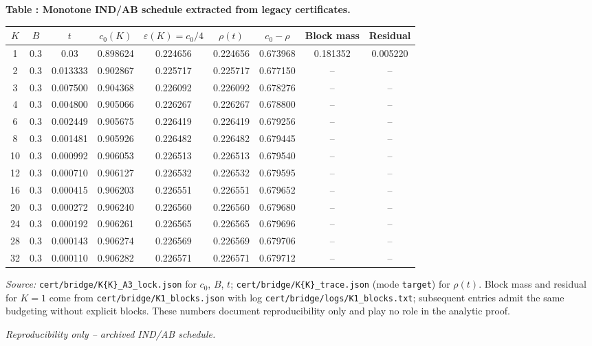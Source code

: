 \label{tab:ind-schedule}
\begin{center}
  \small\textbf{Table \thetable: Monotone IND/AB schedule extracted from legacy certificates.}
\end{center}
\begin{center}
  \small
  \begin{tabular}{ccccccccc}
    \toprule
    $K$ & $B$ & $t$ & $c_0(K)$ & $\varepsilon(K)=c_0/4$ & $\rho(t)$ & $c_0-\rho$ & Block mass & Residual \\
    \midrule
    1 & 0.3 & 0.03 & 0.898624 & 0.224656 & 0.224656 & 0.673968 & 0.181352 & 0.005220 \\
    2 & 0.3 & 0.013333 & 0.902867 & 0.225717 & 0.225717 & 0.677150 & -- & -- \\
    3 & 0.3 & 0.007500 & 0.904368 & 0.226092 & 0.226092 & 0.678276 & -- & -- \\
    4 & 0.3 & 0.004800 & 0.905066 & 0.226267 & 0.226267 & 0.678800 & -- & -- \\
    6 & 0.3 & 0.002449 & 0.905675 & 0.226419 & 0.226419 & 0.679256 & -- & -- \\
    8 & 0.3 & 0.001481 & 0.905926 & 0.226482 & 0.226482 & 0.679445 & -- & -- \\
    10 & 0.3 & 0.000992 & 0.906053 & 0.226513 & 0.226513 & 0.679540 & -- & -- \\
    12 & 0.3 & 0.000710 & 0.906127 & 0.226532 & 0.226532 & 0.679595 & -- & -- \\
    16 & 0.3 & 0.000415 & 0.906203 & 0.226551 & 0.226551 & 0.679652 & -- & -- \\
    20 & 0.3 & 0.000272 & 0.906240 & 0.226560 & 0.226560 & 0.679680 & -- & -- \\
    24 & 0.3 & 0.000192 & 0.906261 & 0.226565 & 0.226565 & 0.679696 & -- & -- \\
    28 & 0.3 & 0.000143 & 0.906274 & 0.226569 & 0.226569 & 0.679706 & -- & -- \\
    32 & 0.3 & 0.000110 & 0.906282 & 0.226571 & 0.226571 & 0.679712 & -- & -- \\
    \bottomrule
  \end{tabular}
\end{center}
\par\smallskip
\noindent\emph{Source:}
\texttt{cert/bridge/K\{K\}\_A3\_lock.json} for $c_0$, $B$, $t$;
\texttt{cert/bridge/K\{K\}\_trace.json} (mode \texttt{target}) for $\rho(t)$.
Block mass and residual for $K=1$ come from \texttt{cert/bridge/K1\_blocks.json}
with log \texttt{cert/bridge/logs/K1\_blocks.txt}; subsequent entries admit the same
budgeting without explicit blocks. These numbers document reproducibility only and
play no role in the analytic proof.
\begin{center}
  \footnotesize\itshape Reproducibility only – archived IND/AB schedule.
\end{center}
